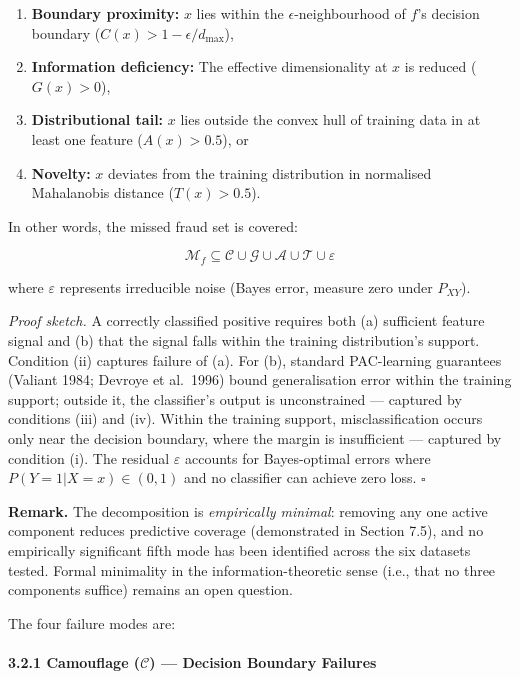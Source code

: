 \documentclass[
  11pt,
]{article}
\providecommand{\tightlist}{%
  \setlength{\itemsep}{0pt}\setlength{\parskip}{0pt}}
\begin{document}
\begin{enumerate}
\def\labelenumi{(\roman{enumi})}
\tightlist
\item
  \textbf{Boundary proximity:} \(x\) lies within the
  \(\epsilon\)-neighbourhood of \(f\)’s decision boundary
  (\(C(x) > 1 - \epsilon/d_{\max}\)),
\item
  \textbf{Information deficiency:} The effective dimensionality at \(x\)
  is reduced (\(G(x) > 0\)),
\item
  \textbf{Distributional tail:} \(x\) lies outside the convex hull of
  training data in at least one feature (\(A(x) > 0.5\)), or
\item
  \textbf{Novelty:} \(x\) deviates from the training distribution in
  normalised Mahalanobis distance (\(T(x) > 0.5\)).
\end{enumerate}

In other words, the missed fraud set is covered:

\[\mathcal{M}_f \subseteq \mathcal{C} \cup \mathcal{G} \cup \mathcal{A} \cup \mathcal{T} \cup \varepsilon\]

where \(\varepsilon\) represents irreducible noise (Bayes error, measure
zero under \(P_{XY}\)).

\emph{Proof sketch.} A correctly classified positive requires both (a)
sufficient feature signal and (b) that the signal falls within the
training distribution’s support. Condition (ii) captures failure of (a).
For (b), standard PAC-learning guarantees (Valiant 1984; Devroye et
al.~1996) bound generalisation error within the training support;
outside it, the classifier’s output is unconstrained — captured by
conditions (iii) and (iv). Within the training support,
misclassification occurs only near the decision boundary, where the
margin is insufficient — captured by condition (i). The residual
\(\varepsilon\) accounts for Bayes-optimal errors where
\(P(Y=1|X=x) \in (0,1)\) and no classifier can achieve zero loss.
\(\square\)

\textbf{Remark.} The decomposition is \emph{empirically minimal}:
removing any one active component reduces predictive coverage
(demonstrated in Section 7.5), and no empirically significant fifth mode
has been identified across the six datasets tested. Formal minimality in
the information-theoretic sense (i.e., that no three components suffice)
remains an open question.

The four failure modes are:

\paragraph{\texorpdfstring{3.2.1 Camouflage (\(\mathcal{C}\)) — Decision
Boundary
Failures}{3.2.1 Camouflage (\textbackslash mathcal\{C\}) — Decision Boundary Failures}}\label{camouflage-mathcalc-decision-boundary-failures}
\end{document}

